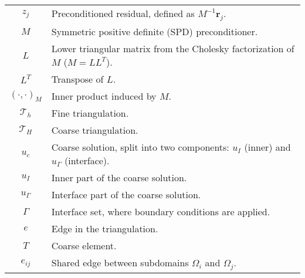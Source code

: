 \begin{longtable}{c p{10cm}}
    $z_j$                           & Preconditioned residual, defined as $M^{-1}\mathbf{r}_j$.                                                     \\
    $M$                             & Symmetric positive definite (SPD) preconditioner.                                                             \\
    $L$                             & Lower triangular matrix from the Cholesky factorization of $M$ ($M=LL^T$).                                    \\
    $L^T$                           & Transpose of $L$.                                                                                             \\
    $(\cdot,\cdot)_M$               & Inner product induced by $M$.                                                                                 \\
    $\mathcal{T}_h$                 & Fine triangulation.                                                                                           \\
    $\mathcal{T}_H$                 & Coarse triangulation.                                                                                         \\
    $u_c$                           & Coarse solution, split into two components: $u_I$ (inner) and $u_{\Gamma}$ (interface).                       \\
    $u_I$                           & Inner part of the coarse solution.                                                                            \\
    $u_{\Gamma}$                    & Interface part of the coarse solution.                                                                        \\
    $\Gamma$                        & Interface set, where boundary conditions are applied.                                                         \\
    $e$                             & Edge in the triangulation.                                                                                    \\
    $T$                             & Coarse element.                                                                                               \\
    $e_{ij}$                        & Shared edge between subdomains $\Omega_i$ and $\Omega_j$.                                                     \\

\end{longtable}
